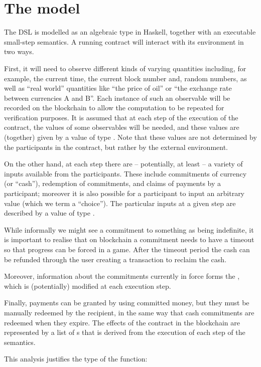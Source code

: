 \documentclass[
      acmsmall
    , screen
    , review=true
  ]{acmart}
\begin{document}
\section{The model}
The DSL is modelled as an algebraic type in Haskell, together with an executable small-step semantics. 
A running contract will interact with its environment in two ways.

First, it will need to observe different kinds of varying quantities including, for example, the current time, the current block number and, random numbers, as well as ``real world'' quantities like ``the price of oil'' or ``the exchange rate between currencies A and B''. Each instance of such an observable will be recorded on the blockchain to allow the computation to be repeated for verification purposes. It is assumed that at each step of the execution of the contract, the values of some observables will be needed, and these values are (together) given by a value of type . Note that these values are not determined by the participants in the contract, but rather by the external environment.

On the other hand, at each step there are -- potentially, at least -- a variety of inputs available from the participants. These include commitments of currency (or ``cash''), redemption of commitments, and claims of payments by a participant; moreover it is also possible for a participant to input an arbitrary value (which we term a ``choice''). The particular inputs at a given step are described by a value of type .

While informally we might see a commitment to something as being indefinite, it is important to realise that on blockchain a commitment needs to have a timeout so that progress can be forced in a game. After the timeout period the cash can be refunded through the user creating a transaction to reclaim the cash.

Moreover, information about the commitments currently in force forms the , which is (potentially) modified at each execution step. 

Finally, payments can be granted by using committed money, but they must be manually redeemed by the recipient, in the 
same way that cash commitments are redeemed when they expire. The effects of the contract in the blockchain are 
represented by a list  of s that is derived from the execution of each step of the semantics.

This analysis justifies the type of the  function:
\end{document}
